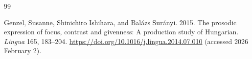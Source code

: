 \documentclass[a4paper, ruler]{CUP-JNL-LIN}%
\begin{document}
\begin{Backmatter}
\begin{thebibliography}{99}

{Genzel, Susanne, Shinichiro Ishihara, and Balázs Surányi}. 2015. The prosodic expression of focus, contrast and givenness: A production study of Hungarian. \textit{Lingua} 165, 183--204. \url{https://doi.org/10.1016/j.lingua.2014.07.010}  (accessed 2026 February 2).




\end{thebibliography}
\end{Backmatter}
\end{document}
